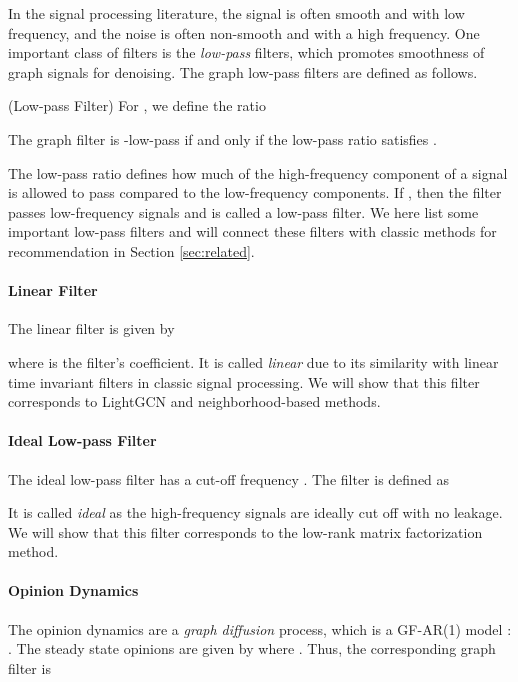 \documentclass[sigconf]{acmart}
\begin{document}
In the signal processing literature, the signal is often smooth and with low frequency, and the noise is often non-smooth and with a high frequency. One important class of filters is the \emph{low-pass} filters, which promotes smoothness of graph signals for denoising. The graph low-pass filters are defined as follows. 
\begin{definition} (Low-pass Filter) \label{def:lpf}
    For , we define the ratio
    
    The graph filter  is -low-pass if and only if the low-pass ratio satisfies .
\end{definition}
The low-pass ratio defines how much of the high-frequency component of a signal is allowed to pass compared to the low-frequency components. If , then the filter passes low-frequency signals and is  called a low-pass filter. We here list some important low-pass filters and will connect these filters with classic methods for recommendation in Section \ref{sec:related}.
\paragraph{Linear Filter} The linear filter is given by 

where  is the filter's coefficient. It is called \emph{linear} due to its similarity with linear time invariant filters in classic signal processing. We will show that this filter corresponds to LightGCN and neighborhood-based methods.

\paragraph{Ideal Low-pass Filter} 
The ideal low-pass filter has a cut-off frequency . The filter is defined as 

It is called \emph{ideal} as the high-frequency signals are ideally cut off with no leakage. We will show that this filter corresponds to the low-rank matrix factorization method. 

\paragraph{Opinion Dynamics} The opinion dynamics are a \emph{graph diffusion} process, which is a GF-AR(1) model \cite{friedkin2011formal}: . The steady state opinions are given by  where . Thus, the corresponding graph filter is
\end{document}
